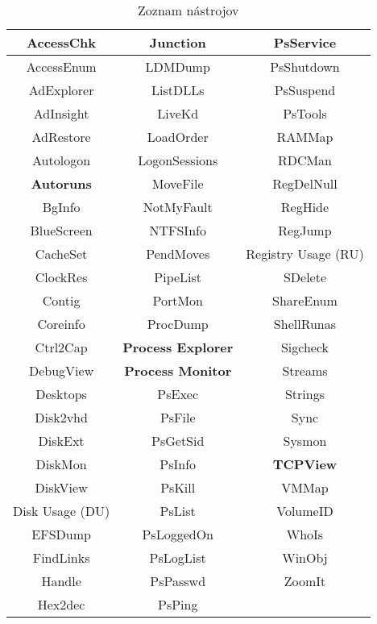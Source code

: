 \documentclass[conference]{IEEEtran}
\begin{document}
\begin{table}[htbp]
    \caption{Zoznam nástrojov}
    \begin{center}
    \begin{tabular}{|c|c|c|}
    \hline
    AccessChk & Junction & PsService \\ \hline
    AccessEnum & LDMDump & PsShutdown \\ \hline
    AdExplorer & ListDLLs & PsSuspend \\ \hline
    AdInsight & LiveKd & PsTools \\ \hline
    AdRestore & LoadOrder & RAMMap \\ \hline
    Autologon & LogonSessions & RDCMan \\ \hline
    \textbf{Autoruns} & MoveFile & RegDelNull \\ \hline
    BgInfo & NotMyFault & RegHide \\ \hline
    BlueScreen & NTFSInfo & RegJump \\ \hline
    CacheSet & PendMoves & Registry Usage (RU) \\ \hline
    ClockRes & PipeList & SDelete \\ \hline
    Contig & PortMon & ShareEnum \\ \hline
    Coreinfo & ProcDump & ShellRunas \\ \hline
    Ctrl2Cap & \textbf{Process Explorer} & Sigcheck \\ \hline
    DebugView & \textbf{Process Monitor} & Streams \\ \hline
    Desktops & PsExec & Strings \\ \hline
    Disk2vhd & PsFile & Sync \\ \hline
    DiskExt & PsGetSid & Sysmon \\ \hline
    DiskMon & PsInfo & \textbf{TCPView} \\ \hline
    DiskView & PsKill & VMMap \\ \hline
    Disk Usage (DU) & PsList & VolumeID \\ \hline
    EFSDump & PsLoggedOn & WhoIs \\ \hline
    FindLinks & PsLogList & WinObj \\ \hline
    Handle & PsPasswd & ZoomIt \\ \hline
    Hex2dec & PsPing & \\ \hline
    \end{tabular}
    \label{tab1}
    \end{center}
\end{table}
\end{document}
